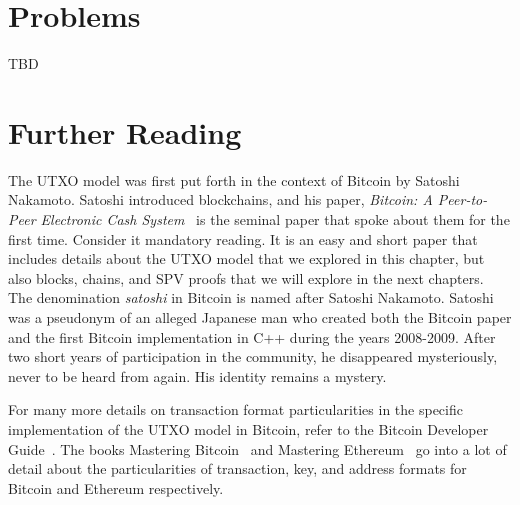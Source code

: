 \section*{Problems}

TBD

\section*{Further Reading}

The UTXO model was first put forth in the context of Bitcoin by Satoshi Nakamoto. Satoshi
introduced blockchains, and his paper, \emph{Bitcoin: A Peer-to-Peer Electronic Cash System}~\cite{bitcoin} is
the seminal paper that spoke about them for the first time. Consider it mandatory reading.
It is an easy and short paper that includes details about the UTXO model that we explored
in this chapter, but also blocks, chains, and SPV proofs that we will explore in the next chapters.
The denomination \emph{satoshi} in Bitcoin is named after Satoshi Nakamoto.
Satoshi was a pseudonym of an alleged Japanese man
who created both the Bitcoin paper and the first Bitcoin implementation in C++ during the years
2008-2009. After two short years of participation in the community, he disappeared mysteriously, never
to be heard from again. His identity remains a mystery.

For many more details on transaction format particularities in the specific implementation of the UTXO
model in Bitcoin, refer to the Bitcoin Developer Guide~\cite{bitcoin-dev-guide}.
The books Mastering Bitcoin~\cite{mastering-bitcoin} and Mastering Ethereum~\cite{mastering-ethereum}
go into a lot of detail about the particularities of transaction, key, and address formats
for Bitcoin and Ethereum respectively.

